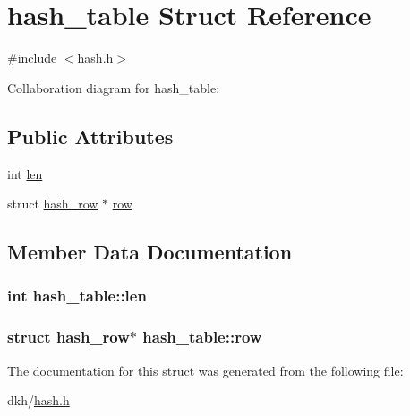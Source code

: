 \hypertarget{structhash__table}{\section{hash\+\_\+table Struct Reference}
\label{structhash__table}
}


{\ttfamily \#include $<$hash.\+h$>$}



Collaboration diagram for hash\+\_\+table\+:
\subsection*{Public Attributes}
\begin{DoxyCompactItemize}
\item 
int \hyperlink{structhash__table_a5c37715c358be0aea139f968bd44d3ae}{len}
\item 
struct \hyperlink{structhash__row}{hash\+\_\+row} $\ast$ \hyperlink{structhash__table_a634ff501f78f223799d4923fbcbbf30d}{row}
\end{DoxyCompactItemize}


\subsection{Member Data Documentation}
\hypertarget{structhash__table_a5c37715c358be0aea139f968bd44d3ae}{
\subsubsection[{len}]{\setlength{\rightskip}{0pt plus 5cm}int hash\+\_\+table\+::len}}\label{structhash__table_a5c37715c358be0aea139f968bd44d3ae}
\hypertarget{structhash__table_a634ff501f78f223799d4923fbcbbf30d}{
\subsubsection[{row}]{\setlength{\rightskip}{0pt plus 5cm}struct {\bf hash\+\_\+row}$\ast$ hash\+\_\+table\+::row}}\label{structhash__table_a634ff501f78f223799d4923fbcbbf30d}


The documentation for this struct was generated from the following file\+:\begin{DoxyCompactItemize}
\item 
dkh/\hyperlink{hash_8h}{hash.\+h}\end{DoxyCompactItemize}

